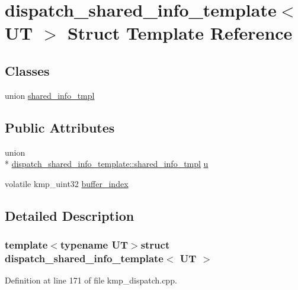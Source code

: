\hypertarget{structdispatch__shared__info__template}{\section{dispatch\-\_\-shared\-\_\-info\-\_\-template$<$ U\-T $>$ Struct Template Reference}
\label{structdispatch__shared__info__template}
}
\subsection*{Classes}
\begin{DoxyCompactItemize}
\item 
union \hyperlink{uniondispatch__shared__info__template_1_1shared__info__tmpl}{shared\-\_\-info\-\_\-tmpl}
\end{DoxyCompactItemize}
\subsection*{Public Attributes}
\begin{DoxyCompactItemize}
\item 
union \\*
\hyperlink{uniondispatch__shared__info__template_1_1shared__info__tmpl}{dispatch\-\_\-shared\-\_\-info\-\_\-template\-::shared\-\_\-info\-\_\-tmpl} \hyperlink{structdispatch__shared__info__template_addc37a0a7602f461c2be5840b5fbea23}{u}
\item 
volatile kmp\-\_\-uint32 \hyperlink{structdispatch__shared__info__template_adbb52e9b93edf55cee184b9b44a6e77a}{buffer\-\_\-index}
\end{DoxyCompactItemize}


\subsection{Detailed Description}
\subsubsection*{template$<$typename U\-T$>$struct dispatch\-\_\-shared\-\_\-info\-\_\-template$<$ U\-T $>$}



Definition at line 171 of file kmp\-\_\-dispatch.\-cpp.



